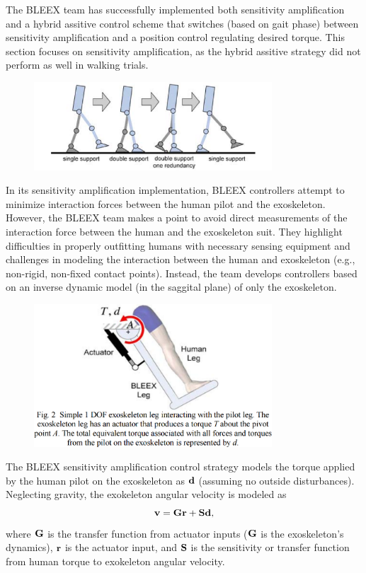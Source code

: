 \begin{refsection}
The BLEEX team has successfully implemented both sensitivity amplification \cite{sesitivityAmpPaper2005} and a hybrid assitive control scheme \cite{bleex_hybrid_control_2006} that switches (based on gait phase) between sensitivity amplification and a position control regulating desired torque. This section focuses on sensitivity amplification, as the hybrid assitive strategy did not perform as well in walking trials.

\begin{figure}[ht]
  \centering
  \includegraphics[width=3.5in]{exos/figs/bleex_support_phases.png}
\end{figure}

In its sensitivity amplification implementation, BLEEX controllers attempt to minimize interaction forces between the human pilot and the exoskeleton. However, the BLEEX team makes a point to avoid direct measurements of the interaction force between the human and the exoskeleton suit.  They highlight difficulties in properly outfitting humans with necessary sensing equipment and challenges in modeling the interaction between the human and exoskeleton (e.g., non-rigid, non-fixed contact points).  Instead, the team develops controllers based on an inverse dynamic model (in the saggital plane) of only the exoskeleton.  

\begin{figure}[ht]
  \centering
  \includegraphics[width=3.5in]{exos/figs/bleex_1dof_ex.png}
\end{figure}

The BLEEX sensitivity amplification control strategy models the torque applied by the human pilot on the exoskeleton as ${\bf d}$ (assuming no outside disturbances).   Neglecting gravity, the exokeleton angular velocity is modeled as 
\[{\bf v} = {\bf G} {\bf r} + {\bf S} {\bf d} ,\] 
where ${\bf G}$ is the transfer function from actuator inputs (${\bf G}$ is the exoskeleton's dynamics), ${\bf r}$ is the actuator input, and ${\bf S}$ is the sensitivity or transfer function from human torque to exokeleton angular velocity. 


\end{refsection}
